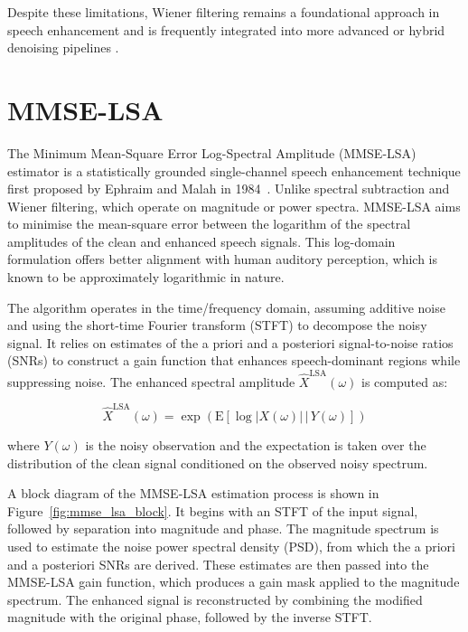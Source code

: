 Despite these limitations, Wiener filtering remains a foundational approach in speech enhancement and is frequently integrated into more advanced or hybrid denoising pipelines \cite{dubey2016evaluation, loizou2013speech}.


\section{MMSE-LSA}
\label{sec:mmse_lsa}

The Minimum Mean-Square Error Log-Spectral Amplitude (MMSE-LSA) estimator is a statistically grounded single-channel speech enhancement technique first proposed by Ephraim and Malah in 1984~\cite{ephraim1984speech}. Unlike spectral subtraction and Wiener filtering, which operate on magnitude or power spectra. MMSE-LSA aims to minimise the mean-square error between the logarithm of the spectral amplitudes of the clean and enhanced speech signals. This log-domain formulation offers better alignment with human auditory perception, which is known to be approximately logarithmic in nature.

The algorithm operates in the time/frequency domain, assuming additive noise and using the short-time Fourier transform (STFT) to decompose the noisy signal. It relies on estimates of the a priori and a posteriori signal-to-noise ratios (SNRs) to construct a gain function that enhances speech-dominant regions while suppressing noise. The enhanced spectral amplitude \( \hat{X}^{\text{LSA}}(\omega) \) is computed as:

\begin{equation}
    \hat{X}^{\text{LSA}}(\omega) = \exp \left( \mathrm{E} \left[ \log |X(\omega)| \,\big|\, Y(\omega) \right] \right)
\end{equation}

where \( Y(\omega) \) is the noisy observation and the expectation is taken over the distribution of the clean signal conditioned on the observed noisy spectrum.

A block diagram of the MMSE-LSA estimation process is shown in Figure~\ref{fig:mmse_lsa_block}. It begins with an STFT of the input signal, followed by separation into magnitude and phase. The magnitude spectrum is used to estimate the noise power spectral density (PSD), from which the a priori and a posteriori SNRs are derived. These estimates are then passed into the MMSE-LSA gain function, which produces a gain mask applied to the magnitude spectrum. The enhanced signal is reconstructed by combining the modified magnitude with the original phase, followed by the inverse STFT.

